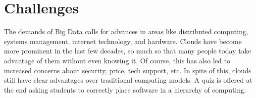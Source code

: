 

\section{Challenges}

The demands of Big Data calls for advances in areas like distributed
computing, systems management, internet technology, and hardware. Clouds
have become more prominent in the last few decades, so much so that many
people today take advantage of them without even knowing it. Of course,
this has also led to increased concerns about security, price, tech
support, etc. In spite of this, clouds still have clear advantages over
traditional computing models. A quiz is offered at the end asking
students to correctly place software in a hierarchy of computing.


